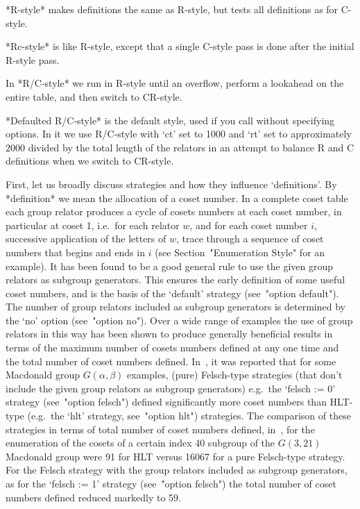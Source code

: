 *R\*-style* makes definitions the  same
as R-style, but tests all definitions as for C-style.

*Rc-style* is like R-style, except that a
single C-style pass is done after the initial R-style pass.

In *R/C-style* we run in R-style  until
an overflow, perform a lookahead on the entire table, and then  switch
to CR-style.

*Defaulted     R/C-style* is the default style,  used  if  you  call  {\ACE}  without
specifying options. In it we use R/C-style with `ct' set to  1000  and
`rt' set to approximately $2000$ divided by the total  length  of  the
relators in an attempt to balance R and C definitions when  we  switch
to CR-style.


First, let us  broadly  discuss  strategies  and  how  they  influence
\lq{}definitions'.  By  *definition*  we  mean   the
allocation of a coset number. In a complete  coset  table  each  group
relator produces a cycle of cosets numbers at each  coset  number,  in
particular at coset 1, i.e.~for each relator $w$, and for  each  coset
number $i$, successive  application  of  the  letters  of  $w$,  trace
through a sequence of coset numbers that begins and ends in  $i$  (see
Section~"Enumeration Style" for an example). It has been found to be a
good general  rule  to  use  the  given  group  relators  as  subgroup
generators. This ensures the early definition  of  some  useful  coset
numbers, and is the  basis  of  the  `default'  strategy  (see~"option
default").  The  number  of  group  relators  included   as   subgroup
generators is determined by the `no' option (see~"option no"). Over  a
wide range of examples the use of group relators in this way has  been
shown to produce generally beneficial results in terms of the  maximum
number of cosets numbers defined at any one time and the total  number
of coset numbers defined. In~\cite{CDHW73}, it was reported  that  for
some Macdonald group $G(\alpha,\beta)$  examples,  (pure)  Felsch-type
strategies (that don't include the given group  relators  as  subgroup
generators) e.g.~the `felsch  :=  0'  strategy  (see~"option  felsch")
defined significantly more coset numbers than HLT-type (e.g.~the `hlt'
strategy,  see~"option  hlt")  strategies.  The  comparison  of  these
strategies  in  terms  of  total  number  of  coset  numbers  defined,
in~\cite{Hav91}, for the enumeration of the cosets of a certain  index
40 subgroup of the $G(3,21)$ Macdonald group were 91  for  HLT  versus
16067 for a pure Felsch-type strategy. For the  Felsch  strategy  with
the group relators included as subgroup generators, as for the `felsch
:= 1' strategy (see~"option felsch") the total number of coset numbers
defined reduced markedly to 59.

